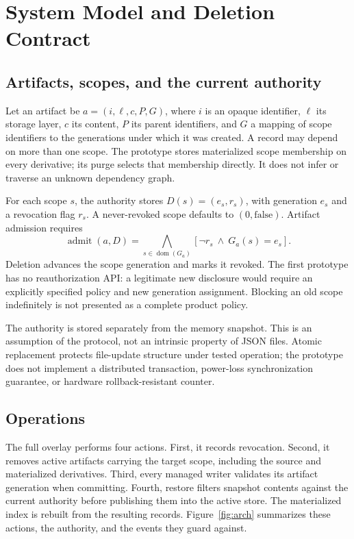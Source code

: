 ﻿\documentclass[sigconf,nonacm]{acmart}
\begin{document}
\section{System Model and Deletion Contract}
\subsection{Artifacts, scopes, and the current authority}
Let an artifact be $a=(i,\ell,c,P,G)$, where $i$ is an opaque identifier, $\ell$ its storage layer, $c$ its content, $P$ its parent identifiers, and $G$ a mapping of scope identifiers to the generations under which it was created. A record may depend on more than one scope. The prototype stores materialized scope membership on every derivative; its purge selects that membership directly. It does not infer or traverse an unknown dependency graph.

For each scope $s$, the authority stores $D(s)=(e_s,r_s)$, with generation $e_s$ and a revocation flag $r_s$. A never-revoked scope defaults to $(0,\mathrm{false})$. Artifact admission requires
\begin{equation}
 \operatorname{admit}(a,D)=\bigwedge_{s\in\operatorname{dom}(G_a)}
 [\neg r_s\ \land\ G_a(s)=e_s].
\label{eq:admit}
\end{equation}
Deletion advances the scope generation and marks it revoked. The first prototype has no reauthorization API: a legitimate new disclosure would require an explicitly specified policy and new generation assignment. Blocking an old scope indefinitely is not presented as a complete product policy.

The authority is stored separately from the memory snapshot. This is an assumption of the protocol, not an intrinsic property of JSON files. Atomic replacement protects file-update structure under tested operation; the prototype does not implement a distributed transaction, power-loss synchronization guarantee, or hardware rollback-resistant counter.

\subsection{Operations}
The full overlay performs four actions. First, it records revocation. Second, it removes active artifacts carrying the target scope, including the source and materialized derivatives. Third, every managed writer validates its artifact generation when committing. Fourth, restore filters snapshot contents against the current authority before publishing them into the active store. The materialized index is rebuilt from the resulting records. Figure~\ref{fig:arch} summarizes these actions, the authority, and the events they guard against.
\end{document}
